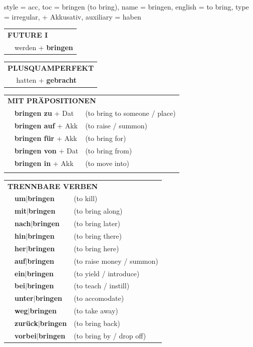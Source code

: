 \begin{verbentry}{
  style = {acc},
  toc = {bringen (to bring)},
  name = {bringen},
  english = {to bring},
  type = {irregular, + Akkusativ},
  auxiliary = {haben}
}
\begin{tabular}{rl}
    \multicolumn{2}{l}{\textbf{FUTURE I} }\\
  &  werden + \textbf{bringen}\\
 
  \end{tabular}
\hfill
   \begin{tabular}{rl}
      \multicolumn{2}{l}{\textbf{PLUSQUAMPERFEKT}}\\
   & hatten + \textbf{gebracht}\\
  \end{tabular}

  
  \vspace{10pt}

   \begin{tabular}{lll}
      \multicolumn{3}{l}{\textbf{MIT PRÄPOSITIONEN}}\\
& \textbf{bringen zu} + Dat & (to bring to someone / place)\\
&\textbf{bringen auf} + Akk & (to raise / summon)\\
&\textbf{bringen für} + Akk & (to bring for)\\
&\textbf{bringen von} + Dat & (to bring from)\\
&\textbf{bringen in} + Akk & (to move into)\\
\vspace{70pt}
  \end{tabular}
  \hfill
   \begin{tabular}{lll}
      \multicolumn{3}{l}{\textbf{TRENNBARE VERBEN}}\\
 & \textbf{um$|$bringen} & (to kill)\\
 & \textbf{mit$|$bringen} & (to bring along)\\
  & \textbf{nach$|$bringen} & (to bring later)\\
  & \textbf{hin$|$bringen} & (to bring there)\\
  & \textbf{her$|$bringen} & (to bring here)\\
     & \textbf{auf$|$bringen} & (to raise money / summon)\\
     & \textbf{ein$|$bringen} & (to yield / introduce)\\
     & \textbf{bei$|$bringen} & (to teach / instill)\\
     & \textbf{unter$|$bringen} & (to accomodate)\\
     & \textbf{weg$|$bringen} & (to take away)\\
      & \textbf{zurück$|$bringen} & (to bring back)\\

      & \textbf{vorbei$|$bringen} & (to bring by / drop off)\\
  \end{tabular}


  \vspace{-5pt}
\end{verbentry}

